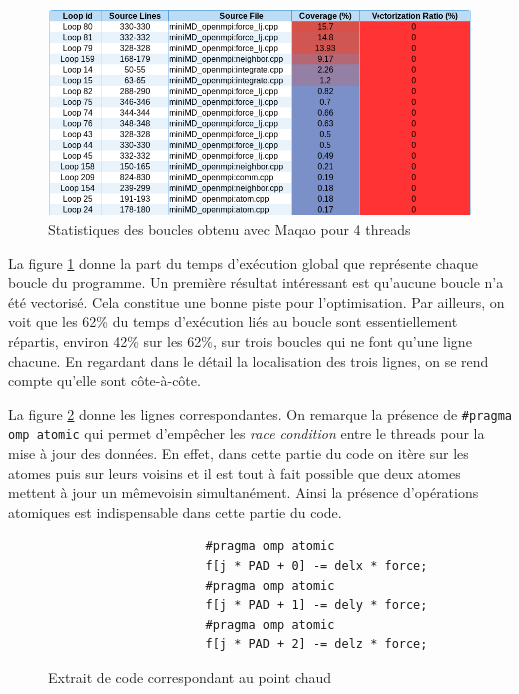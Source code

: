 \documentclass[11pt,a4paper]{article}
\begin{document}
			\begin{figure}[h!]
				\centering
				\begin{center}
					\includegraphics[width=500px]{images/maqao_loops.png}
					\caption{Statistiques des boucles obtenu avec Maqao pour 4 threads}
					\label{loop_maqao}
				\end{center}
			\end{figure}

			La figure \ref{loop_maqao} donne la part du temps d'exécution global que représente chaque boucle du programme. Un première résultat intéressant est qu'aucune boucle n'a été vectorisé. Cela constitue une bonne piste pour l'optimisation. Par ailleurs, on voit que les 62\% du temps d'exécution liés au boucle sont essentiellement répartis, environ 42\% sur les 62\%, sur trois boucles qui ne font qu'une ligne chacune. En regardant dans le détail la localisation des trois lignes, on se rend compte qu'elle sont côte-à-côte.

			La figure \ref{code:hotspot} donne les lignes correspondantes. On remarque la présence de \verb!#pragma omp atomic! qui permet d'empêcher les \textit{race condition} entre le threads pour la mise à jour des données. En effet, dans cette partie du code on itère sur les atomes puis sur leurs voisins et il est tout à fait possible que deux atomes mettent à jour un mêmevoisin simultanément. Ainsi la présence d'opérations atomiques est indispensable dans cette partie du code.

			\begin{figure}[h!]
				\centering
				\begin{verbatim}
					  #pragma omp atomic
					  f[j * PAD + 0] -= delx * force;
					  #pragma omp atomic
					  f[j * PAD + 1] -= dely * force;
					  #pragma omp atomic
					  f[j * PAD + 2] -= delz * force;
				\end{verbatim}
				\caption{Extrait de code correspondant au point chaud}
				\label{code:hotspot}
			\end{figure}
\end{document}
